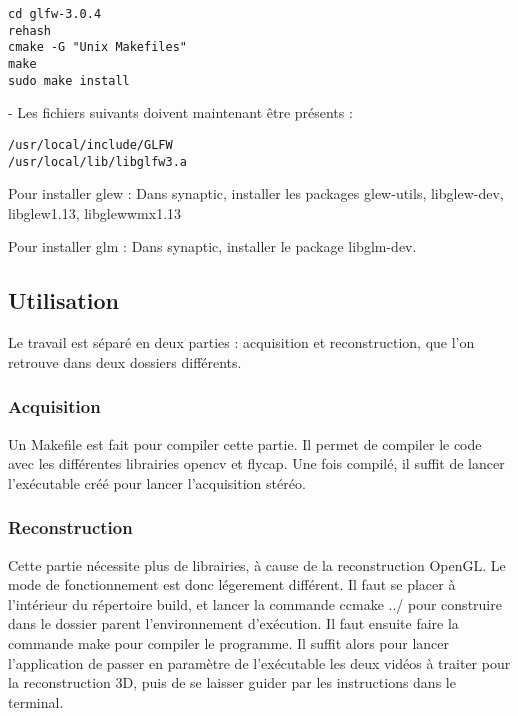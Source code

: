 \begin{verbatim}
cd glfw-3.0.4
rehash
cmake -G "Unix Makefiles"
make
sudo make install
\end{verbatim}

- Les fichiers suivants doivent maintenant être présents :

\begin{verbatim}
/usr/local/include/GLFW
/usr/local/lib/libglfw3.a
\end{verbatim}

Pour installer glew :
Dans synaptic, installer les packages glew-utils, libglew-dev, libglew1.13, libglewwmx1.13

Pour installer glm :
Dans synaptic, installer le package libglm-dev.

\subsection{Utilisation}

Le travail est séparé en deux parties : acquisition et reconstruction, que l'on retrouve dans deux dossiers différents.

\subsubsection{Acquisition}

Un Makefile est fait pour compiler cette partie. Il permet de compiler le code avec les différentes librairies opencv et flycap. Une fois compilé, il suffit de lancer l'exécutable créé pour lancer l'acquisition stéréo.

\subsubsection{Reconstruction}

Cette partie nécessite plus de librairies, à cause de la reconstruction OpenGL. Le mode de fonctionnement est donc légerement différent. Il faut se placer à l'intérieur du répertoire build, et lancer la commande ccmake ../ pour construire dans le dossier parent l'environnement d'exécution. Il faut ensuite faire la commande make pour compiler le programme. Il suffit alors pour lancer l'application de passer en paramètre de l'exécutable les deux vidéos à traiter pour la reconstruction 3D, puis de se laisser guider par les instructions dans le terminal.